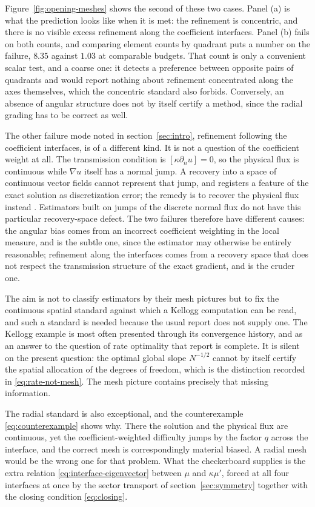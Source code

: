 \documentclass[10pt,pdftex]{amsart}%
\numberwithin{equation}{section}
\begin{document}
Figure~\ref{fig:opening-meshes} shows the second of these two cases.  Panel (a) is what the prediction looks like when it is met: the refinement is concentric, and there is no visible excess refinement along the coefficient interfaces.  Panel (b) fails on both counts, and comparing element counts by quadrant puts a number on the failure, $8.35$ against $1.03$ at comparable budgets.  That count is only a convenient scalar test, and a coarse one: it detects a preference between opposite pairs of quadrants and would report nothing about refinement concentrated along the axes themselves, which the concentric standard also forbids.  Conversely, an absence of angular structure does not by itself certify a method, since the radial grading has to be correct as well.

The other failure mode noted in section~\ref{sec:intro}, refinement following the coefficient interfaces, is of a different kind.  It is not a question of the coefficient weight at all.  The transmission condition is $[\kappa\partial_nu]=0$, so the physical flux is continuous while $\nabla u$ itself has a normal jump.  A recovery into a space of continuous vector fields cannot represent that jump, and registers a feature of the exact solution as discretization error; the remedy is to recover the physical flux instead \cite{CZ09}.  Estimators built on jumps of the discrete normal flux do not have this particular recovery-space defect.  The two failures therefore have different causes: the angular bias comes from an incorrect coefficient weighting in the local measure, and is the subtle one, since the estimator may otherwise be entirely reasonable; refinement along the interfaces comes from a recovery space that does not respect the transmission structure of the exact gradient, and is the cruder one.

The aim is not to classify estimators by their mesh pictures but to fix the continuous spatial standard against which a Kellogg computation can be read, and such a standard is needed because the usual report does not supply one.  The Kellogg example is most often presented through its convergence history, and as an answer to the question of rate optimality that report is complete.  It is silent on the present question: the optimal global slope $N^{-1/2}$ cannot by itself certify the spatial allocation of the degrees of freedom, which is the distinction recorded in \eqref{eq:rate-not-mesh}.  The mesh picture contains precisely that missing information.

The radial standard is also exceptional, and the counterexample \eqref{eq:counterexample} shows why.  There the solution and the physical flux are continuous, yet the coefficient-weighted difficulty jumps by the factor $q$ across the interface, and the correct mesh is correspondingly material biased.  A radial mesh would be the wrong one for that problem.  What the checkerboard supplies is the extra relation \eqref{eq:interface-eigenvector} between $\mu$ and $\kappa\mu'$, forced at all four interfaces at once by the sector transport of section~\ref{sec:symmetry} together with the closing condition \eqref{eq:closing}.
\end{document}
